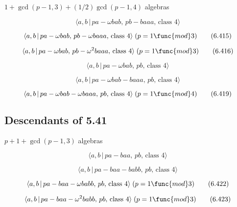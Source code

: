 \documentclass[10pt]{article}
\begin{document}
$1+\gcd (p-1,3)+(1/2)\gcd (p-1,4)$ algebras

\begin{equation}
\langle a,b\,|\,pa-\omega bab,\,pb-baaa,\,\text{class }4\rangle  \tag{6.414}
\end{equation}

\begin{equation}
\langle a,b\,|\,pa-\omega bab,\,pb-\omega baaa,\,\text{class }4\rangle\;(p=1 
\func{mod} 3)  \tag{6.415}
\end{equation}

\begin{equation}
\langle a,b\,|\,pa-\omega bab,\,pb-\omega ^2baaa,\,\text{class }%
4\rangle\;(p=1 \func{mod} 3)  \tag{6.416}
\end{equation}

\begin{equation}
\langle a,b\,|\,pa-\omega bab,\,pb,\,\text{class }4\rangle  \tag{6.417}
\end{equation}

\begin{equation}
\langle a,b\,|\,pa-\omega bab-baaa,\,pb,\,\text{class }4\rangle  \tag{6.418}
\end{equation}

\begin{equation}
\langle a,b\,|\,pa-\omega bab-\omega baaa,\,pb,\,\text{class }4\rangle\;(p=1 
\func{mod} 4)  \tag{6.419}
\end{equation}

\subsection{Descendants of 5.41}

$p+1+\gcd (p-1,3)$ algebras

\begin{equation}
\langle a,b\,|\,pa-baa,\,pb,\,\text{class }4\rangle  \tag{6.420}
\end{equation}

\begin{equation}
\langle a,b\,|\,pa-baa-babb,\,pb,\,\text{class }4\rangle  \tag{6.421}
\end{equation}

\begin{equation}
\langle a,b\,|\,pa-baa-\omega babb,\,pb,\,\text{class }4\rangle\;(p=1 \func{%
mod} 3)  \tag{6.422}
\end{equation}

\begin{equation}
\langle a,b\,|\,pa-baa-\omega ^2babb,\,pb,\,\text{class }4\rangle\;(p=1 
\func{mod} 3)  \tag{6.423}
\end{equation}
\end{document}
